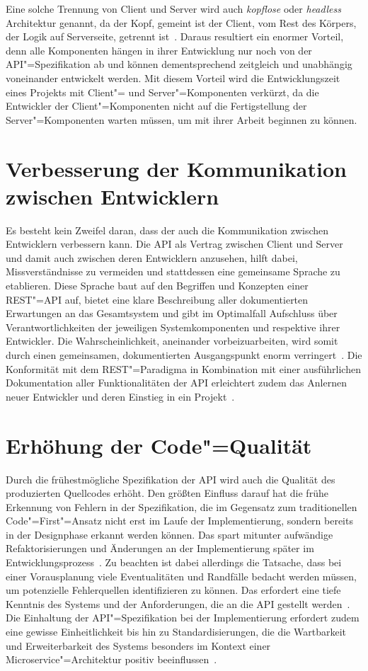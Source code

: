 Eine solche Trennung von Client und Server wird auch \emph{kopflose} oder \emph{\foreignlanguage{american}{headless}} Architektur genannt, da der Kopf, gemeint ist der Client, vom Rest des Körpers, der Logik auf Serverseite, getrennt ist~\cite[5]{kul23}.
Daraus resultiert ein enormer Vorteil, denn alle Komponenten hängen in ihrer Entwicklung nur noch von der \ac{API}"=Spezifikation ab und können dementsprechend zeitgleich und unabhängig voneinander entwickelt werden.
Mit diesem Vorteil wird die Entwicklungszeit eines Projekts mit Client"= und Server"=Komponenten verkürzt, da die Entwickler der Client"=Komponenten nicht auf die Fertigstellung der Server"=Komponenten warten müssen, um mit ihrer Arbeit beginnen zu können.

\section{Verbesserung der Kommunikation zwischen Entwicklern}
Es besteht kein Zweifel daran, dass der \AFA auch die Kommunikation zwischen Entwicklern verbessern kann.
Die \ac{API} als Vertrag zwischen Client und Server und damit auch zwischen deren Entwicklern anzusehen, hilft dabei, Missverständnisse zu vermeiden und stattdessen eine gemeinsame Sprache zu etablieren. Diese Sprache baut auf den Begriffen und Konzepten einer \acs{REST}"=\acs{API} auf, bietet eine klare Beschreibung aller dokumentierten Erwartungen an das Gesamtsystem und gibt im Optimalfall Aufschluss über Verantwortlichkeiten der jeweiligen Systemkomponenten und respektive ihrer Entwickler.
Die Wahrscheinlichkeit, aneinander vorbeizuarbeiten, wird somit durch einen gemeinsamen, dokumentierten Ausgangspunkt enorm verringert~\cite[1628]{cha21}.
Die Konformität mit dem \ac{REST}"=Paradigma in Kombination mit einer ausführlichen Dokumentation aller Funktionalitäten der \ac{API} erleichtert zudem das Anlernen neuer Entwickler und deren Einstieg in ein Projekt~\cite[355]{de23}.

\section{Erhöhung der Code"=Qualität}
Durch die frühestmögliche Spezifikation der \ac{API} wird auch die Qualität des produzierten Quellcodes erhöht.
Den größten Einfluss darauf hat die frühe Erkennung von Fehlern in der Spezifikation, die im Gegensatz zum traditionellen Code"=First"=Ansatz nicht erst im Laufe der Implementierung, sondern bereits in der Designphase erkannt werden können.
Das spart mitunter aufwändige Refaktorisierungen und Änderungen an der Implementierung später im Entwicklungsprozess~\cite{vol22}.
Zu beachten ist dabei allerdings die Tatsache, dass bei einer Vorausplanung viele Eventualitäten und Randfälle bedacht werden müssen, um potenzielle Fehlerquellen identifizieren zu können. Das erfordert eine tiefe Kenntnis des Systems und der Anforderungen, die an die \ac{API} gestellt werden~\cite[362]{de23}.
Die Einhaltung der \ac{API}"=Spezifikation bei der Implementierung erfordert zudem eine gewisse Einheitlichkeit bis hin zu Standardisierungen, die die Wartbarkeit und Erweiterbarkeit des Systems besonders im Kontext einer Microservice"=Architektur positiv beeinflussen~\cite[1628]{cha21}.
